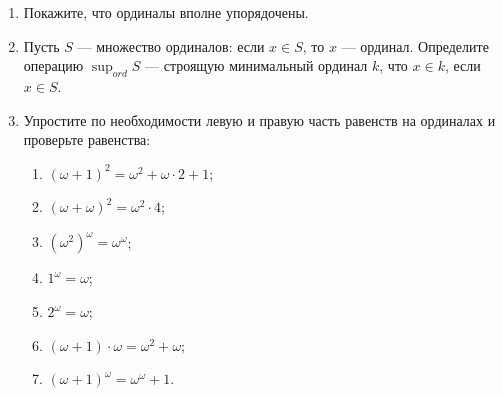 \documentclass[10pt,a4paper,oneside]{article}
\begin{document}
\begin{enumerate}
\item Покажите, что ординалы вполне упорядочены.

\item Пусть $S$ --- множество ординалов: если $x \in S$, то $x$ --- ординал.
Определите операцию $\sup_{ord} S$ --- строящую минимальный ординал $k$, что
$x\in k$, если $x \in S$.

\item Упростите по необходимости левую и правую часть равенств на ординалах и проверьте равенства:
\begin{enumerate}
\item $(\omega+1)^2 = \omega^2 + \omega\cdot 2 + 1$;
\item $(\omega+\omega)^2 = \omega^2 \cdot 4$;
\item $(\omega^2)^\omega = \omega^\omega$;
\item $1^\omega = \omega$;
\item $2^\omega = \omega$;
\item $(\omega+1)\cdot\omega = \omega^2 + \omega$;
\item $(\omega+1)^\omega = \omega^\omega + 1$.
\end{enumerate}
\end{enumerate}

%

%
\end{document}
